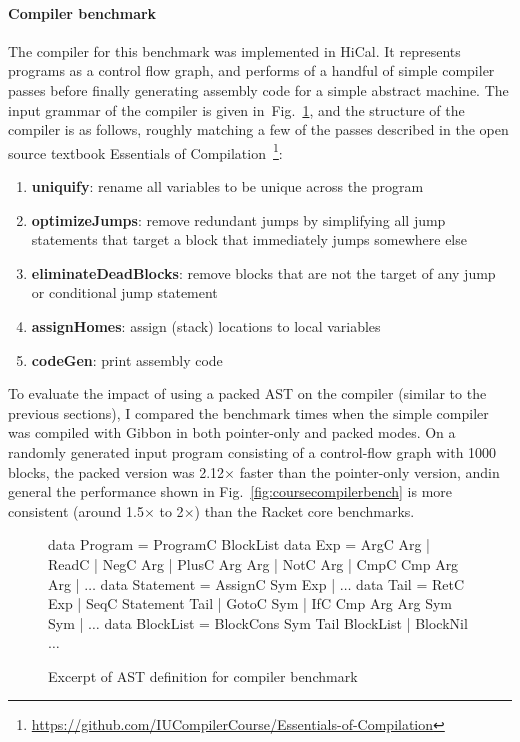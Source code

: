 \documentclass[showabstract,showacknowledgments,showpreface,showdedication,school]{iuphd}
\theoremstyle{nonumberplain}
\newcommand{\lamadt} [0]{HiCal\xspace}
\newcommand{\figref}[1]{Fig.~\ref{#1}}
\begin{document}
\paragraph{Compiler benchmark}
The compiler for this benchmark was implemented in \lamadt{}. It represents
programs as a control flow graph, and performs of a handful of simple compiler
passes before finally generating assembly code for a simple abstract machine.
The input grammar of the compiler is given
in~\figref{fig:coursecompilergrammar}, and the structure of the compiler is as
follows, roughly matching a few of the passes described
in the open source textbook Essentials of Compilation~\footnote{\url{https://github.com/IUCompilerCourse/Essentials-of-Compilation}}:
\begin{enumerate}
  \item \textbf{uniquify}: rename all variables to be unique across the program
  \item \textbf{optimizeJumps}: remove redundant jumps by simplifying all jump
        statements that target a block that immediately jumps somewhere else
  \item \textbf{eliminateDeadBlocks}: remove blocks that are not the target of
        any jump or conditional jump statement
  \item \textbf{assignHomes}: assign (stack) locations to local variables
  \item \textbf{codeGen}: print assembly code
\end{enumerate}

To evaluate the impact of using a packed AST on the compiler (similar to the
previous sections), I compared the benchmark times when the simple compiler was
compiled with Gibbon in both pointer-only and packed modes. On a randomly
generated input program consisting of a control-flow graph with 1000 blocks, the
packed version was 2.12$\times$ faster than the pointer-only version, andin general
the performance shown in \figref{fig:coursecompilerbench} is more consistent
(around 1.5$\times$ to 2$\times$) than the Racket core benchmarks.

\begin{figure}
\footnotesize
\begin{code}
data Program = ProgramC BlockList
data Exp = ArgC Arg | ReadC | NegC Arg | PlusC Arg Arg | NotC Arg
         | CmpC Cmp Arg Arg | $\ldots$
data Statement = AssignC Sym Exp | $\ldots$
data Tail = RetC Exp | SeqC Statement Tail | GotoC Sym
          | IfC Cmp Arg Arg Sym Sym | $\ldots$
data BlockList = BlockCons Sym Tail BlockList | BlockNil
$\ldots$
\end{code}
\caption{Excerpt of AST definition for compiler benchmark}\label{fig:coursecompilergrammar}
\end{figure}
\end{document}
